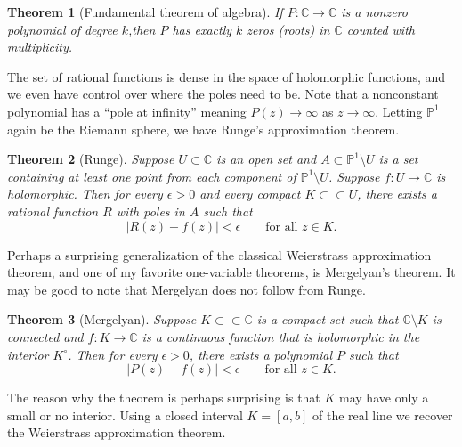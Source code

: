 \documentclass[12pt,openany]{book}
\newcommand{\sabs}[1]{\lvert {#1} \rvert}
\newcommand{\C}{{\mathbb{C}}}
\newcommand{\bP}{{\mathbb{P}}}
\theoremstyle{plain}
\newtheorem{thm}{Theorem}[section]
\theoremstyle{remark}
\theoremstyle{definition}
\theoremstyle{exercise}
\theoremstyle{example}
\begin{document}
\begin{thm}[Fundamental theorem of algebra]
\label{thm:fundamentalthmalg}%
If $P \colon \C \to \C$ is a nonzero polynomial of degree $k$,\linebreak[2]
then $P$
has exactly $k$ zeros (roots) in $\C$ counted with multiplicity.
\end{thm}

The set of rational functions is dense in the space of holomorphic
functions, and we even have control over where the poles need to be.
Note that a nonconstant polynomial has a ``pole at infinity'' meaning
$P(z) \to \infty$ as $z \to \infty$.  Letting $\bP^1$ again be the Riemann
sphere, we have Runge's approximation theorem.

\begin{thm}[Runge]
Suppose $U \subset \C$ is an open set and $A \subset \bP^1 \setminus U$
is a set containing at least one point from each component of
$\bP^1 \setminus U$.  Suppose $f \colon U \to \C$ is holomorphic.
Then for every $\epsilon > 0$ and every compact
$K \subset \subset U$, there exists a rational function $R$ with poles in $A$
such that
\begin{equation*}
\sabs{R(z) - f(z)} < \epsilon \qquad \text{for all $z \in K$}.
\end{equation*}
\end{thm}

Perhaps a surprising generalization of the
classical Weierstrass approximation theorem,
and one of my favorite one-variable theorems,
is Mergelyan's theorem.
It may be good to note that Mergelyan does not follow from Runge.

\begin{thm}[Mergelyan] \label{thm:mergelyan}
Suppose $K \subset \subset \C$ is a compact set such that $\C \setminus K$
is connected and
$f \colon K \to \C$ is a continuous function that is
holomorphic in the interior $K^\circ$.
Then for every $\epsilon > 0$, there exists a polynomial $P$
such that
\begin{equation*}
\sabs{P(z) - f(z)} < \epsilon \qquad \text{for all $z \in K$}.
\end{equation*}
\end{thm}

The reason why the theorem is perhaps
surprising is that $K$ may have only a
small or no interior.  Using a closed interval $K=[a,b]$ of the real line we
recover the Weierstrass approximation theorem.
\end{document}
